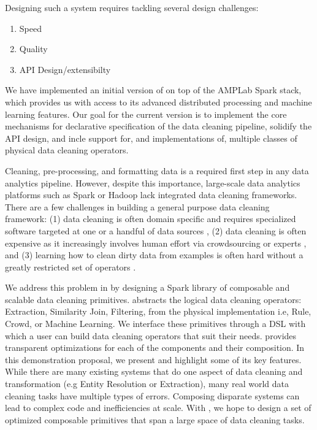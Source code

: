 Designing such a system requires tackling several design challenges:

\begin{enumerate}
\item Speed
\item Quality
\item API Design/extensibilty
\end{enumerate}



We have implemented an initial version of \sys on top of the AMPLab Spark stack, which provides us 
with access to its advanced distributed processing and machine learning features.  Our goal for the current
version is to implement the core mechanisms for declarative specification of the
data cleaning pipeline, solidify the API design, and incle support for, and implementations of,
multiple classes of physical data cleaning operators.


\fi




Cleaning, pre-processing, and formatting data is a required first step in any data analytics pipeline.
However, despite this importance, large-scale data analytics platforms such as Spark or Hadoop lack integrated data cleaning frameworks.
There are a few challenges in building a general purpose data cleaning framework: (1) data cleaning is often
domain specific and requires specialized software targeted at one or a handful of data sources \cite{wang1999sample}, (2) data cleaning is often 
expensive as it increasingly involves human effort via crowdsourcing or experts \cite{DBLP:conf/sigmod/GokhaleDDNRSZ14}, and (3) learning how to clean dirty data from examples
is often hard without a greatly restricted set of operators \cite{DBLP:conf/uist/GuoKHH11}.

We address this problem in \projx by designing a Spark library of composable and scalable data cleaning primitives.
\projx abstracts the logical data cleaning operators: Extraction, Similarity Join, Filtering, from the physical implementation i.e, Rule, Crowd, or Machine Learning.
We interface these primitives through a DSL with which a user can build data cleaning operators that suit their needs.
\projx provides transparent optimizations for each of the components and their composition.
In this demonstration proposal, we present \projx and highlight some of its key features.
While there are many existing systems that do one aspect of data cleaning and transformation (e.g Entity Resolution or Extraction), 
many real world data cleaning tasks have multiple types of errors.
Composing disparate systems can lead to complex code and inefficiencies at scale.
With \projx, we hope to design a set of optimized composable primitives that span a large space of data cleaning tasks.

